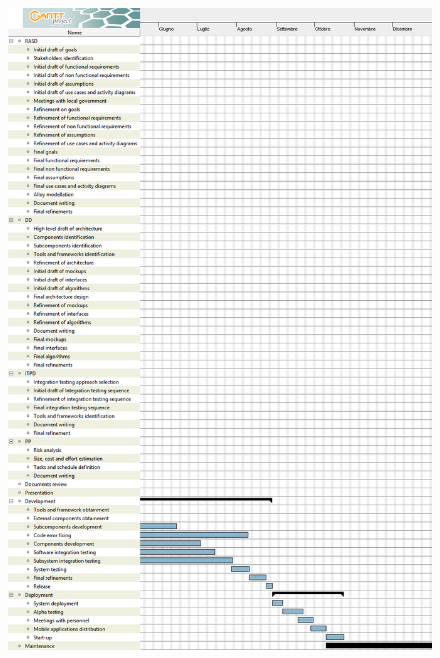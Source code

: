 \begin{figure}[H]
	\centering
	\includegraphics[width=\textwidth, keepaspectratio]{task_and_schedule/diagrams/Tasks2.png}
\end{figure}